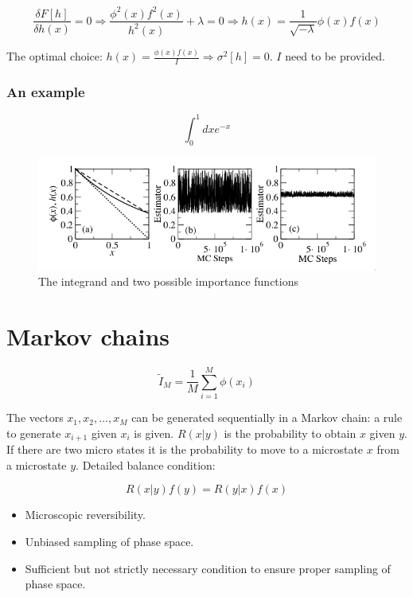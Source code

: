 	$$\frac{\delta F[h]}{\delta h(x)} = 0\Rightarrow\frac{\phi^2(x)f^2(x)}{h^2(x)}+\lambda = 0\Rightarrow h(x) = \frac{1}{\sqrt{-\lambda}}\phi(x)f(x)$$

	The optimal choice: $h(x) = \frac{\phi(x)f(x)}{I}\Rightarrow \sigma^2[h] =0$.
	$I$ need to be provided.

		\subsubsection{An example}

		$$\int_0^1 dxe^{-x}$$

		\begin{figure}[h]
			\includegraphics[width=\textwidth]{importance-sampling}
			\caption{The integrand and two possible importance functions}
			\label{fig:importance-sampling-example}
		\end{figure}

\section{Markov chains}

$$\tilde{I}_M = \frac{1}{M}\sum\limits_{i=1}^M\phi(x_i)$$

The vectors $x_1, x_2, \dots, x_M$ can be generated sequentially in a Markov chain: a rule to generate $x_{i+1}$ given $x_i$ is given.
$R(x|y)$ is the probability to obtain $x$ given $y$.
If there are two micro states it is the probability to move to a microstate $x$ from a microstate $y$.
Detailed balance condition:

$$R(x|y)f(y) = R(y|x)f(x)$$

\begin{itemize}
	\item Microscopic reversibility.
	\item Unbiased sampling of phase space.
	\item Sufficient but not strictly necessary condition to ensure proper sampling of phase space.
\end{itemize}

